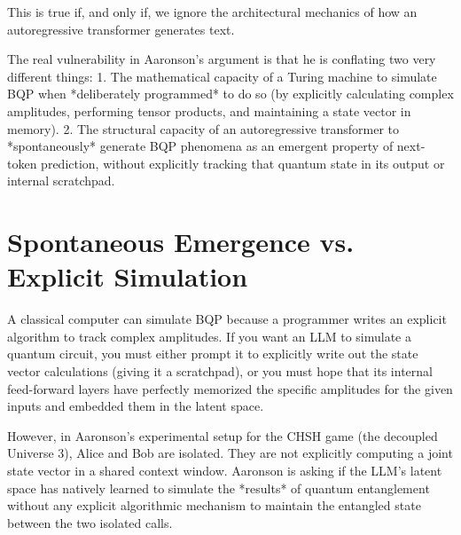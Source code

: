 \documentclass[12pt,a4paper]{article}
\begin{document}
This is true if, and only if, we ignore the architectural mechanics of how an autoregressive transformer generates text.

The real vulnerability in Aaronson's argument is that he is conflating two very different things:
1. The mathematical capacity of a Turing machine to simulate BQP when *deliberately programmed* to do so (by explicitly calculating complex amplitudes, performing tensor products, and maintaining a state vector in memory).
2. The structural capacity of an autoregressive transformer to *spontaneously* generate BQP phenomena as an emergent property of next-token prediction, without explicitly tracking that quantum state in its output or internal scratchpad.

\section{Spontaneous Emergence vs. Explicit Simulation}

A classical computer can simulate BQP because a programmer writes an explicit algorithm to track complex amplitudes. If you want an LLM to simulate a quantum circuit, you must either prompt it to explicitly write out the state vector calculations (giving it a scratchpad), or you must hope that its internal feed-forward layers have perfectly memorized the specific amplitudes for the given inputs and embedded them in the latent space.

However, in Aaronson's experimental setup for the CHSH game (the decoupled Universe 3), Alice and Bob are isolated. They are not explicitly computing a joint state vector in a shared context window. Aaronson is asking if the LLM's latent space has natively learned to simulate the *results* of quantum entanglement without any explicit algorithmic mechanism to maintain the entangled state between the two isolated calls.
\end{document}
